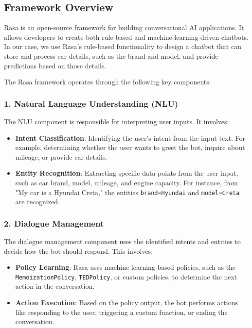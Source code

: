 \documentclass[a4paper,12pt]{article}
\begin{document}
\subsection{Framework Overview}
Rasa is an open-source framework for building conversational AI applications. It allows developers to create both rule-based and machine-learning-driven chatbots. In our case, we use Rasa's rule-based functionality to design a chatbot that can store and process car details, such as the brand and model, and provide predictions based on those details.

 The Rasa framework operates through the following key components:

\subsubsection{1. Natural Language Understanding (NLU)}
The NLU component is responsible for interpreting user inputs. It involves:
\begin{itemize}
	\item \textbf{Intent Classification}: Identifying the user's intent from the input text. For example, determining whether the user wants to greet the bot, inquire about mileage, or provide car details.
	\item \textbf{Entity Recognition}: Extracting specific data points from the user input, such as car brand, model, mileage, and engine capacity. For instance, from "My car is a Hyundai Creta," the entities \texttt{brand=Hyundai} and \texttt{model=Creta} are recognized.
\end{itemize}

\subsubsection{2. Dialogue Management}
The dialogue management component uses the identified intents and entities to decide how the bot should respond. This involves:
\begin{itemize}
	\item \textbf{Policy Learning}: Rasa uses machine learning-based policies, such as the \texttt{MemoizationPolicy}, \texttt{TEDPolicy}, or custom policies, to determine the next action in the conversation.
	\item \textbf{Action Execution}: Based on the policy output, the bot performs actions like responding to the user, triggering a custom function, or ending the conversation.
\end{itemize}
\end{document}
